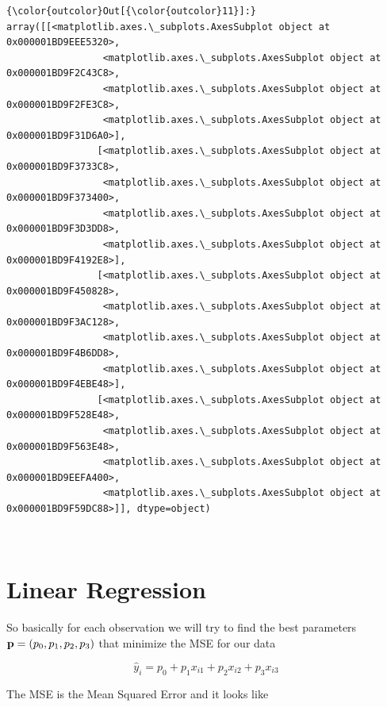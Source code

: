 \documentclass[11pt]{article}
\begin{document}
\begin{Verbatim}[commandchars=\\\{\}]
{\color{outcolor}Out[{\color{outcolor}11}]:} array([[<matplotlib.axes.\_subplots.AxesSubplot object at 0x000001BD9EEE5320>,
                 <matplotlib.axes.\_subplots.AxesSubplot object at 0x000001BD9F2C43C8>,
                 <matplotlib.axes.\_subplots.AxesSubplot object at 0x000001BD9F2FE3C8>,
                 <matplotlib.axes.\_subplots.AxesSubplot object at 0x000001BD9F31D6A0>],
                [<matplotlib.axes.\_subplots.AxesSubplot object at 0x000001BD9F3733C8>,
                 <matplotlib.axes.\_subplots.AxesSubplot object at 0x000001BD9F373400>,
                 <matplotlib.axes.\_subplots.AxesSubplot object at 0x000001BD9F3D3DD8>,
                 <matplotlib.axes.\_subplots.AxesSubplot object at 0x000001BD9F4192E8>],
                [<matplotlib.axes.\_subplots.AxesSubplot object at 0x000001BD9F450828>,
                 <matplotlib.axes.\_subplots.AxesSubplot object at 0x000001BD9F3AC128>,
                 <matplotlib.axes.\_subplots.AxesSubplot object at 0x000001BD9F4B6DD8>,
                 <matplotlib.axes.\_subplots.AxesSubplot object at 0x000001BD9F4EBE48>],
                [<matplotlib.axes.\_subplots.AxesSubplot object at 0x000001BD9F528E48>,
                 <matplotlib.axes.\_subplots.AxesSubplot object at 0x000001BD9F563E48>,
                 <matplotlib.axes.\_subplots.AxesSubplot object at 0x000001BD9EEFA400>,
                 <matplotlib.axes.\_subplots.AxesSubplot object at 0x000001BD9F59DC88>]], dtype=object)
\end{Verbatim}
            
    \begin{center}
    \end{center}
    { \hspace*{\fill} \\}
    
    \section{Linear Regression}\label{linear-regression}

    So basically for each observation we will try to find the best
parameters \({\bf p} = (p_0, p_1, p_2, p_3)\) that minimize the MSE for
our data

\[
\hat y_i=p_0+p_1x_{i1}+p_2x_{i2}+p_3x_{i3}
\]

The MSE is the Mean Squared Error and it looks like
\end{document}
